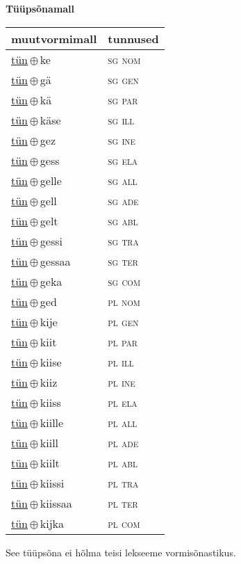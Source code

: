 

\vspace{3.5em}
\noindent \begin{minipage}{\textwidth}
\noindent \textbf{Tüüpsõnamall \,}\\

\begin{sideways}
\begin{tabular}{l l}
muutvormimall & tunnused \\
\hline
\underline{tün}\,$\oplus$\,ke & \textsc{ sg nom } \\
\underline{tün}\,$\oplus$\,gä & \textsc{ sg gen } \\
\underline{tün}\,$\oplus$\,kä & \textsc{ sg par } \\
\underline{tün}\,$\oplus$\,käse & \textsc{ sg ill } \\
\underline{tün}\,$\oplus$\,gez & \textsc{ sg ine } \\
\underline{tün}\,$\oplus$\,gess & \textsc{ sg ela } \\
\underline{tün}\,$\oplus$\,gelle & \textsc{ sg all } \\
\underline{tün}\,$\oplus$\,gell & \textsc{ sg ade } \\
\underline{tün}\,$\oplus$\,gelt & \textsc{ sg abl } \\
\underline{tün}\,$\oplus$\,gessi & \textsc{ sg tra } \\
\underline{tün}\,$\oplus$\,gessaa & \textsc{ sg ter } \\
\underline{tün}\,$\oplus$\,geka & \textsc{ sg com } \\
\underline{tün}\,$\oplus$\,ged & \textsc{ pl nom } \\
\underline{tün}\,$\oplus$\,kije & \textsc{ pl gen } \\
\underline{tün}\,$\oplus$\,kiit & \textsc{ pl par } \\
\underline{tün}\,$\oplus$\,kiise & \textsc{ pl ill } \\
\underline{tün}\,$\oplus$\,kiiz & \textsc{ pl ine } \\
\underline{tün}\,$\oplus$\,kiiss & \textsc{ pl ela } \\
\underline{tün}\,$\oplus$\,kiille & \textsc{ pl all } \\
\underline{tün}\,$\oplus$\,kiill & \textsc{ pl ade } \\
\underline{tün}\,$\oplus$\,kiilt & \textsc{ pl abl } \\
\underline{tün}\,$\oplus$\,kiissi & \textsc{ pl tra } \\
\underline{tün}\,$\oplus$\,kiissaa & \textsc{ pl ter } \\
\underline{tün}\,$\oplus$\,kijka & \textsc{ pl com } \\
\end{tabular}
\end{sideways}
\label{tab:tüüpsõnamall-tünke}

\end{minipage}

 
\vspace{1em}
\noindent See tüüpsõna ei hõlma teisi lekseeme vormi\-sõnastikus.

